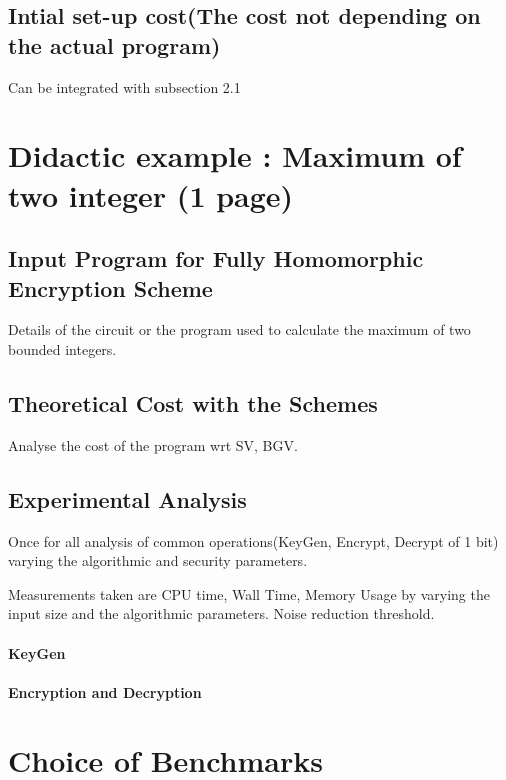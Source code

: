 \documentclass{acm_proc_article-sp}
\begin{document}
\subsection{Intial set-up cost(The cost not depending on the actual program)}

Can be integrated with subsection 2.1 

\section{ Didactic example :  Maximum of two integer (1 page)}



\subsection{Input Program for Fully Homomorphic Encryption Scheme}

Details of the circuit or the program used to calculate the maximum of two bounded integers.


\subsection{Theoretical Cost with the Schemes}

Analyse the cost of the program wrt SV, BGV. 

\subsection{Experimental Analysis}

Once for all analysis of common operations(KeyGen, Encrypt, Decrypt of 1 bit) varying the algorithmic and security parameters.


Measurements taken are CPU time, Wall Time, Memory Usage by varying the input size  and the algorithmic parameters. Noise reduction threshold.

\paragraph{KeyGen}


\paragraph{Encryption and Decryption}

\section{Choice of Benchmarks}
\end{document}
